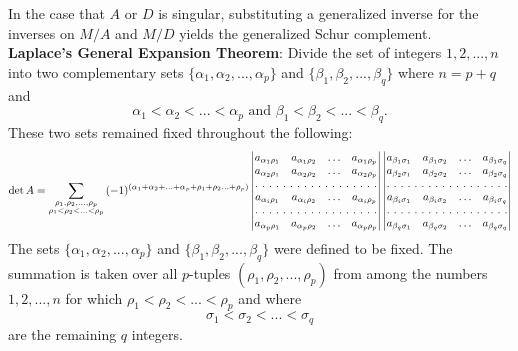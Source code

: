 In the case that $A$ or $D$ is singular, substituting a generalized inverse for the inverses on $M/A$ and $M/D$ yields the generalized Schur complement.\\

{\bf Laplace's General Expansion Theorem}:
Divide the set of integers ${1,2,...,n}$ into two complementary sets $\{\alpha_1, \alpha_2, ..., \alpha_p\}$ and $\{ \beta_1, \beta_2, ..., \beta_q\}$ where $n = p + q$ and
$$\alpha_1 < \alpha_2 < ... < \alpha_p \mbox{ and } \beta_1 < \beta_2 < ... < \beta_q.$$ These two sets remained fixed throughout the following:
\begin{equation}
\det A = \sum_{\substack{\rho_1, \rho_2, ...,\rho_p \\ \rho_1 < \rho_2 < ... < \rho_p}} \, (-1)^{(\alpha_1 + \alpha_2 + ... + \alpha_p + \rho_1 + \rho_2 ... + \rho_p)}
\begin{vmatrix}
a_{\alpha_1\rho_1} & a_{\alpha_1\rho_2}  & \hdots & a_{\alpha_1\rho_p}  \\
a_{\alpha_2\rho_1} & a_{\alpha_2\rho_2}  & \hdots & a_{\alpha_2\rho_p}  \\
\hdotsfor[2]{4}\\
a_{\alpha_i\rho_1} & a_{\alpha_i\rho_2}  & \hdots & a_{\alpha_i\rho_p}  \\
\hdotsfor[2]{4}\\
a_{\alpha_p\rho_1} & a_{\alpha_p\rho_2}  & \hdots & a_{\alpha_p\rho_p}  \\
\end{vmatrix}
\begin{vmatrix}
a_{\beta_1\sigma_1} & a_{\beta_1\sigma_2}  & \hdots & a_{\beta_1\sigma_q}  \\
a_{\beta_2\sigma_1} & a_{\beta_2\sigma_2}  & \hdots & a_{\beta_2\sigma_q}  \\
\hdotsfor[2]{4}\\
a_{\beta_i\sigma_1} & a_{\beta_i\sigma_2}  & \hdots & a_{\beta_i\sigma_q}  \\
\hdotsfor[2]{4}\\
a_{\beta_q\sigma_1} & a_{\beta_q\sigma_2}  & \hdots & a_{\beta_q\sigma_q}  \\
\end{vmatrix}
\end{equation}
 The sets $\{\alpha_1, \alpha_2, ..., \alpha_p\}$ and $\{ \beta_1, \beta_2, ..., \beta_q\}$  were defined to be fixed. 
 The summation is taken over all $p$-tuples $(\rho_1, \rho_2, ..., \rho_p)$ from among the numbers $1,2,...,n$ for which $\rho_1 < \rho_2 < ... < \rho_p$ and where 
 $$\sigma_1 < \sigma_2 < ... < \sigma_q$$ are the remaining $q$ integers.\\
 

